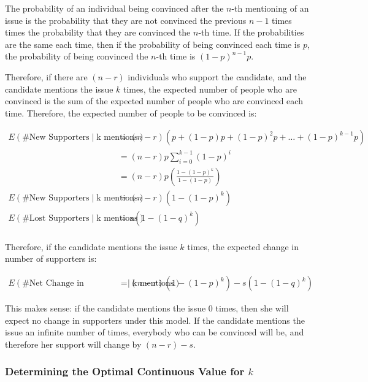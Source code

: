 \documentclass{article}
\begin{document}
The probability of an individual being convinced after the $n$-th
	mentioning of an issue is the probability that they are not
	convinced the previous $n-1$ times times the probability that
	they are convinced the $n$-th time.
If the probabilities are the same each time, then if the probability
	of being convinced each time is $p$, the probability of being
	convinced the $n$-th time is $(1-p)^{n-1}p$.

Therefore, if there are $(n-r)$ individuals who support the candidate,
	and the candidate mentions the issue $k$ times,
	the expected number of people who are convinced is the sum of the
	expected number of people who are convinced each time.
Therefore, the expected number of people to be convinced is:

\begin{align*}
E\left( \text{\# New Supporters} \mid \text{k mentions} \right)
	& = (n - r) \left( p + (1 - p) p + (1 - p)^2 p + \dots + (1 - p)^{k-1} p \right)\\
	& = (n - r) p \sum_{i=0}^{k-1} ( 1 - p )^i \\
	& = (n - r) p \left( \frac{1 - (1 - p)^k}{1 - (1 - p)} \right) \\
E\left( \text{\# New Supporters} \mid \text{k mentions} \right)
	& = (n - r) \left( 1 - (1 - p)^k \right)\\
E\left( \text{\# Lost Supporters} \mid \text{k mentions} \right)
	& = s \left( 1 - (1 - q)^k \right)\\
\end{align*}

Therefore, if the candidate mentions the issue $k$ times, the expected
	change in number of supporters is:

\begin{align*}
E\left( \text{\# Net Change in Supporters} \mid \text{k mentions} \right)
	& =  (n - r) \left( 1 - (1 - p)^k \right)
	- s \left( 1 - (1 - q)^k \right)
\end{align*}

This makes sense: if the candidate mentions the issue $0$ times, then she
	will expect no change in supporters under this model.
If the candidate mentions the issue an infinite number of times,
	everybody who can be convinced will be, and therefore her support
	will change by $(n-r) - s$.

\subsubsection{Determining the Optimal Continuous Value for $k$}
\end{document}
